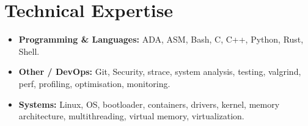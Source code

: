 \documentclass[9pt,a4paper]{article}
\begin{document}
\section*{Technical Expertise}
\begin{tcolorbox}[mybox]
\begin{itemize}
\item \textbf{Programming \& Languages:} ADA, ASM, Bash, C, C++, Python, Rust, Shell.

\item \textbf{Other / DevOps:} Git, Security, strace, system analysis, testing, valgrind, perf, profiling, optimisation, monitoring.

\item \textbf{Systems:} Linux, OS, bootloader, containers, drivers, kernel, memory architecture, multithreading, virtual memory, virtualization.
\end{itemize}
\end{tcolorbox}
\end{document}
